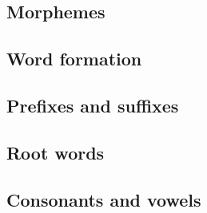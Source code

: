 
\subsection{Morphemes}

\subsection{Word formation}

\subsection{Prefixes and suffixes}

\subsection{Root words}

\subsection{Consonants and vowels}

